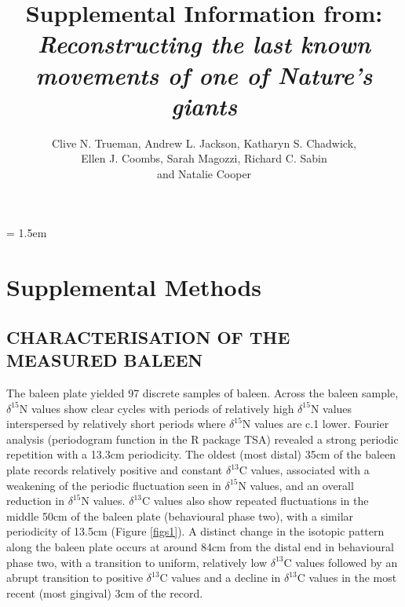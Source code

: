 \documentclass[a4paper,10pt]{article}
\title{Supplemental Information from:\\
\textit{Reconstructing the last known movements of one of Nature's giants}}
\author{Clive N. Trueman, Andrew L. Jackson, Katharyn S. Chadwick,\\ 
Ellen J. Coombs, Sarah Magozzi, Richard C. Sabin\\
and Natalie Cooper}
\date{}
\begin{document}

\maketitle

\parindent = 1.5em
\addtolength{\parskip}{.3em}


\section*{Supplemental Methods}
 
\subsection*{CHARACTERISATION OF THE MEASURED BALEEN}
The baleen plate yielded 97 discrete samples of baleen. 
Across the baleen sample, $\delta^{15}$N values show clear cycles with periods of relatively high $\delta^{15}$N values interspersed by relatively short periods where $\delta^{15}$N values are c.1\text{\textperthousand} lower. 
Fourier analysis (periodogram function in the R package TSA\cite{Chan:2012aa}) revealed a strong periodic repetition with a 13.3cm periodicity. 
The oldest (most distal) 35cm of the baleen plate records relatively positive and constant $\delta^{13}$C values, associated with a weakening of the periodic fluctuation seen in $\delta^{15}$N values, and an overall reduction in $\delta^{15}$N values. 
$\delta^{13}$C values also show repeated fluctuations in the middle 50cm of the baleen plate (behavioural phase two), with a similar periodicity of 13.5cm (Figure \ref{figs1}). 
A distinct change in the isotopic pattern along the baleen plate occurs at around 84cm from the distal end in behavioural phase two, with a transition to uniform, relatively low $\delta^{13}$C values followed by an abrupt transition to positive $\delta^{13}$C values and a decline in $\delta^{13}$C values in the most recent (most gingival) 3cm of the record.
\end{document}
